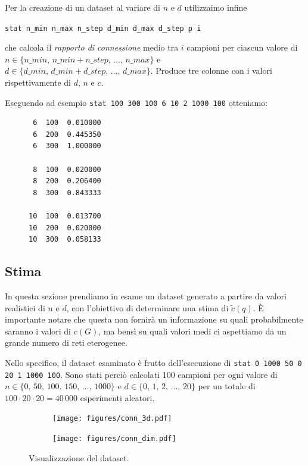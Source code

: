 \documentclass[a4paper,12pt]{article}
\theoremstyle{definition}
\begin{document}
Per la creazione di un dataset al variare di $n$ e $d$ utilizzaimo infine

\centerline{\texttt{stat n\_min n\_max n\_step d\_min d\_max d\_step p i}}

che calcola il \emph{rapporto di connessione} medio tra $i$ campioni per ciascun valore di $n \in \{n\_min,\,n\_min+n\_step,\,\dots,\,n\_max\}$ e $d \in \{d\_min,\,d\_min+d\_step,\,\dots,\,d\_max\}$. Produce tre colonne con i valori rispettivamente di $d$, $n$ e $c$.

Eseguendo ad esempio \texttt{stat 100 300 100 6 10 2 1000 100} otteniamo:

\begin{figure}[H]
\centering
\begin{BVerbatim}
 6  100  0.010000
 6  200  0.445350
 6  300  1.000000

 8  100  0.020000
 8  200  0.206400
 8  300  0.843333

10  100  0.013700
10  200  0.020000
10  300  0.058133
\end{BVerbatim}
\end{figure}

\subsection{Stima}

In questa sezione prendiamo in esame un dataset generato a partire da valori realistici di $n$ e $d$, con l'obiettivo di determinare una stima di $\tilde{c}(q)$. È importante notare che questa non fornirà un informazione su quali probabilmente saranno i valori di $c(G)$, ma bensì su quali valori medi ci aspettiamo da un grande numero di reti eterogenee.

Nello specifico, il dataset esaminato è frutto dell'esecuzione di \texttt{stat 0 1000 50 0 20 1 1000 100}. Sono stati perciò calcolati 100 campioni per ogni valore di $n \in \{0,\,50,\,100,\,150,\,\dots,\,1000\}$ e $d \in \{0,\,1,\,2,\,\dots,\,20\}$ per un totale di $100 \cdot 20 \cdot 20 = 40\,000$ esperimenti aleatori.


\begin{figure}[H]
\begin{subfigure}[b]{0.5\textwidth}
\texttt{[image: figures/conn\_3d.pdf]}
\caption{}
\end{subfigure}
\begin{subfigure}[b]{0.5\textwidth}
\texttt{[image: figures/conn\_dim.pdf]}
\caption{}
\end{subfigure}
\caption{Visualizzazione del dataset.}%
\end{figure}
\end{document}
